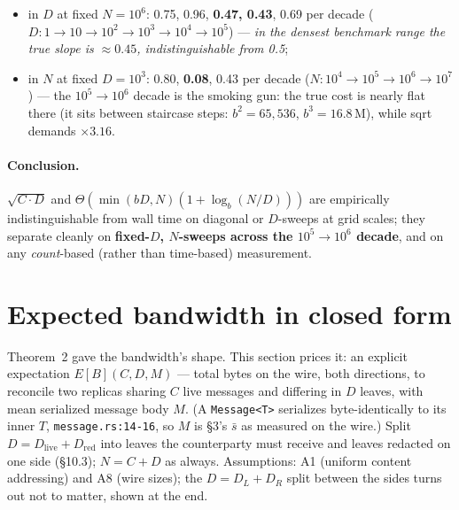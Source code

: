 \documentclass[11pt]{article}
\newcommand{\code}[1]{\texttt{#1}}
\theoremstyle{plain}
\begin{document}
\begin{itemize}
\item in $D$ at fixed $N = 10^6$: 0.75, 0.96, \textbf{0.47, 0.43}, 0.69
  per decade
  ($D\colon 1 \to 10 \to 10^2 \to 10^3 \to 10^4 \to 10^5$) --- \emph{in the
  densest benchmark range the true slope is $\approx 0.45$,
  indistinguishable from 0.5};
\item in $N$ at fixed $D = 10^3$: 0.80, \textbf{0.08}, 0.43 per decade
  ($N\colon 10^4 \to 10^5 \to 10^6 \to 10^7$) --- the $10^5 \to 10^6$
  decade is the smoking gun: the true cost is nearly flat there (it sits
  between staircase steps: $b^2 = 65{,}536$, $b^3 = 16.8\,\mathrm{M}$),
  while sqrt demands $\times 3.16$.
\end{itemize}

\paragraph{Conclusion.} $\sqrt{C \cdot D}$ and
$\Theta(\min(bD, N)(1 + \log_b(N/D)))$ are empirically indistinguishable
from wall time on diagonal or $D$-sweeps at grid scales; they separate
cleanly on \textbf{fixed-$D$, $N$-sweeps across the $10^5 \to 10^6$
decade}, and on any \emph{count}-based (rather than time-based)
measurement.

\section{Expected bandwidth in closed form}

Theorem~2 gave the bandwidth's shape. This section prices it: an explicit
expectation $E[B](C, D, M)$ --- total bytes on the wire, both directions,
to reconcile two replicas sharing $C$ live messages and differing in $D$
leaves, with mean serialized message body $M$. (A \code{Message<T>}
serializes byte-identically to its inner $T$, \code{message.rs:14-16}, so
$M$ is \S3's $\bar{s}$ as measured on the wire.) Split
$D = D_{\mathrm{live}} + D_{\mathrm{red}}$ into leaves the counterparty
must receive and leaves redacted on one side (\S10.3); $N = C + D$ as
always. Assumptions: A1 (uniform content addressing) and A8 (wire sizes);
the $D = D_L + D_R$ split between the sides turns out not to matter, shown
at the end.
\end{document}
